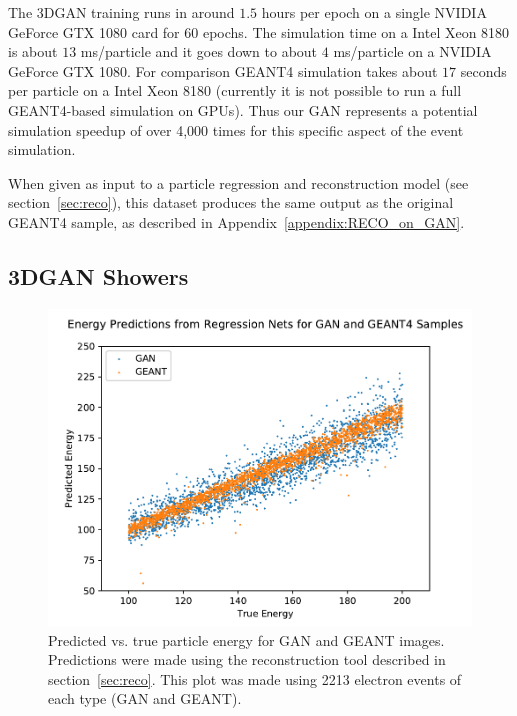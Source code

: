The 3DGAN training runs in around $1.5$ hours per epoch on a single NVIDIA GeForce GTX 1080 card for $60$ epochs. The simulation  time  on a Intel  Xeon 8180  is about $13$ ms/particle  and it goes down to about $4$ ms/particle on a NVIDIA  GeForce  GTX  1080. For  comparison  GEANT4  simulation takes  about $17$ seconds  per  particle on  a  Intel  Xeon  8180 (currently  it  is  not  possible  to  run a full  GEANT4-based  simulation  on  GPUs). Thus our GAN represents a potential simulation speedup of over 4,000 times for this specific aspect of the event simulation.

When given as input to a particle regression and reconstruction model (see section~\ref{sec:reco}), this dataset produces the same output as the original GEANT4 sample, as described in Appendix~\ref{appendix:RECO_on_GAN}.

\subsection*{3DGAN Showers}

\begin{figure}
    \centering
    \includegraphics[scale=0.4, trim={0.5cm 0.1cm 0 1.1cm}, clip]{Images/Calo/GAN_GEANT_energy_regression_comparison.pdf}
    \caption{Predicted vs. true particle energy for GAN and GEANT
      images. Predictions were made using the reconstruction tool described in section~\ref{sec:reco}. This plot was made using 2213 electron events of each type (GAN and GEANT).\label{fig:GAN_regression}}
\end{figure}

